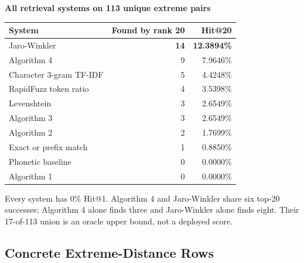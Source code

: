 \documentclass[11pt,a4paper]{article}
\begin{document}
\begin{minipage}[t]{0.47\linewidth}
\textbf{All retrieval systems on 113 unique extreme pairs}\par\smallskip
\small
\centering
\begin{tabular}{@{}lrr@{}}
\toprule
\textbf{System} & \textbf{Found by rank 20} & \textbf{Hit@20} \\
\midrule
Jaro-Winkler & \textbf{14} & \textbf{12.3894\%} \\
Algorithm 4 & 9 & 7.9646\% \\
Character 3-gram TF-IDF & 5 & 4.4248\% \\
RapidFuzz token ratio & 4 & 3.5398\% \\
Levenshtein & 3 & 2.6549\% \\
Algorithm 3 & 3 & 2.6549\% \\
Algorithm 2 & 2 & 1.7699\% \\
Exact or prefix match & 1 & 0.8850\% \\
Phonetic baseline & 0 & 0.0000\% \\
Algorithm 1 & 0 & 0.0000\% \\
\bottomrule
\end{tabular}
\par\smallskip
\raggedright
Every system has 0\% Hit@1. Algorithm 4 and Jaro-Winkler share six top-20
successes; Algorithm 4 alone finds three and Jaro-Winkler alone finds eight.
Their 17-of-113 union is an oracle upper bound, not a deployed score.
\end{minipage}

\subsection{Concrete Extreme-Distance Rows}
\end{document}
